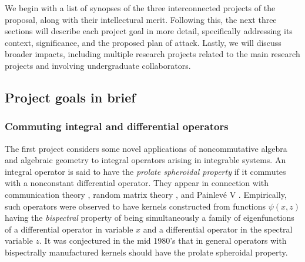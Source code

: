 \documentclass[11pt,letterpaper]{article}
\theoremstyle{definition}
\newcommand{\vocab}[1]{\emph{#1}}
\begin{document}


We begin with a list of synopses of the three interconnected projects of the proposal, along with their intellectural merit.
Following this, the next three sections will describe each project goal in more detail, specifically addressing its context, significance, and the proposed plan of attack.
Lastly, we will discuss broader impacts, including multiple research projects related to the main research projects and involving undergraduate collaborators.
\subsection{Project goals in brief}
\subsubsection*{Commuting integral and differential operators}
The first project considers some novel applications of noncommutative algebra and algebraic geometry to integral operators arising in integrable systems.
An integral operator is said to have the \vocab{prolate spheroidal property} if it commutes with a nonconstant differential operator.  They appear in connection with communication theory \cite{shannon1,shannon2}, random matrix theory \cite{Mehta,TW1,TW2}, and Painlev\'e V \cite{JMMS80}.
Empirically, such operators were observed to have kernels constructed from functions $\psi(x,z)$ having the \vocab{bispectral} property \cite{DG86} of being simultaneously a family of eigenfunctions of a differential operator in variable $x$ and a differential operator in the spectral variable $z$.
It was conjectured in the mid 1980's that in general operators with bispectrally manufactured kernels should have the prolate spheroidal property.
\end{document}
